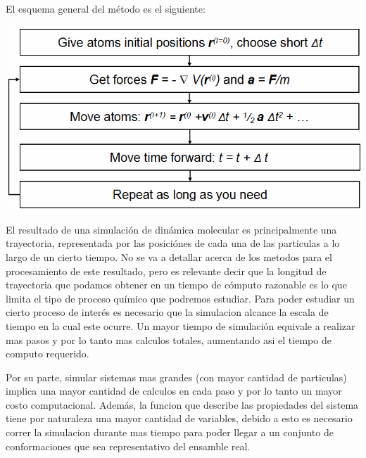 \documentclass[a4paper,10pt]{report}
\begin{document}
El esquema general del método es el siguiente:


\includegraphics[keepaspectratio, width=\textwidth]{img/mdalgorithm.png}


\vspace{20pt}



  



El resultado de una simulación de dinámica molecular es principalmente una trayectoria, representada por las posiciónes de cada una de las particulas a lo largo de un cierto tiempo.
No se va a detallar acerca de los metodos para el procesamiento de este resultado, pero es relevante decir que la longitud de trayectoria que podamos obtener en un tiempo de cómputo razonable es lo que limita el tipo de proceso químico que podremos estudiar.
Para poder estudiar un cierto proceso de interés es necesario que la simulacion alcance la escala de tiempo en la cual este ocurre. Un mayor tiempo de simulación equivale a realizar mas pasos y por lo tanto mas calculos totales, aumentando asi el tiempo de computo requerido.

Por su parte, simular sistemas mas grandes (con mayor cantidad de particulas) implica una mayor cantidad de calculos en cada paso y por lo tanto un mayor costo computacional. Además, la funcion que describe las propiedades del sistema tiene por naturaleza una mayor cantidad de variables, debido a esto es necesario  correr la simulacion durante mas tiempo para poder llegar a un conjunto de conformaciones que sea representativo del ensamble real.
\end{document}
